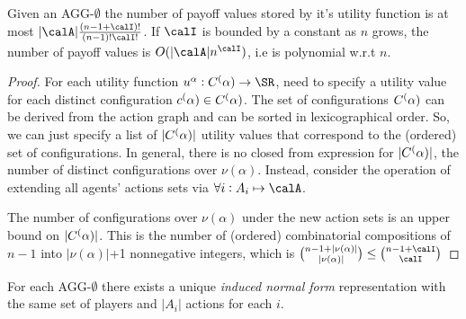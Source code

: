 \begin{prop}
	\label{prop:AGG-2.6}
	Given an AGG-$\emptyset$ the number of payoff values stored by it's utility function is at most \(|\calA|\frac{(n-1+\calI)!}{(n-1)!\calI!}\). If $\calI$ is bounded by a constant as $n$ grows, the number of payoff values is $O(|\calA|n^\calI)$, i.e is polynomial w.r.t $n$.
\end{prop}
\begin{proof}
	For each utility function $u^\alpha:C^\Palpha\to\SR$, need to specify a utility value for each distinct configuration $c^(\alpha) \in C^(\alpha)$. The set of configurations $C^(\alpha)$ can be derived from the action graph and can be sorted in lexicographical order. So, we can just specify a list of $|C^(\alpha)|$ utility values that correspond to the (ordered) set of configurations. In general, there is no closed from expression for $|C^(\alpha)|$, the number of distinct configurations over $\nu(\alpha)$. Instead, consider the operation of extending all agents' actions sets via $\forall i: A_i \mapsto \calA$. 

	The number of configurations over $\nu(\alpha)$ under the new action sets is an upper bound on $|C^(\alpha)|$. This is the number of (ordered) combinatorial compositions of $n-1$ into $|\nu(\alpha)|$+1 nonnegative integers, which is \(\binom{n-1 + |\nu(\alpha)|}{|\nu(\alpha)|} \leq \binom{n-1 + \calI}{\calI}\)
\end{proof}

For each AGG-\(\emptyset\) there exists a unique \emph{induced normal form} representation with the same set of players and $|A_i|$ actions for each $i$.


